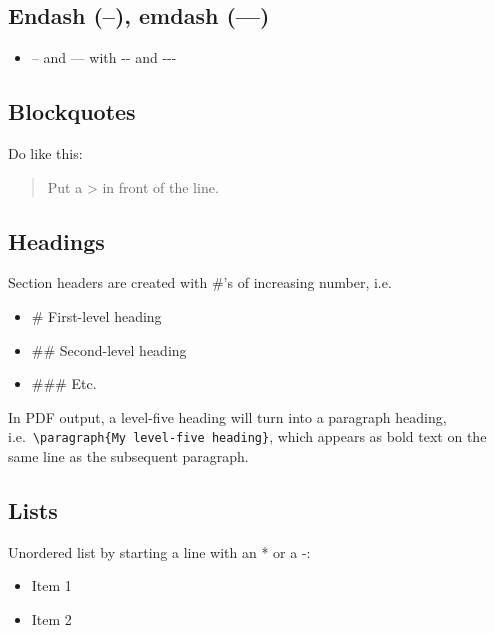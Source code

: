 \documentclass[a4paper, nobind]{templates/ociamthesis}
\providecommand{\tightlist}{%
  \setlength{\itemsep}{0pt}\setlength{\parskip}{0pt}}
\begin{document}
\hypertarget{endash-emdash}{%
\subsection{Endash (--), emdash (---)}\label{endash-emdash}}

\begin{itemize}
\tightlist
\item
  -- and --- with -\/- and -\/-\/-
\end{itemize}

\hypertarget{blockquotes}{%
\subsection{Blockquotes}\label{blockquotes}}

Do like this:

\begin{quote}
Put a \textgreater{} in front of the line.
\end{quote}

\hypertarget{headings}{%
\subsection{Headings}\label{headings}}

Section headers are created with \#'s of increasing number, i.e.~

\begin{itemize}
\tightlist
\item
  \# First-level heading
\item
  \#\# Second-level heading
\item
  \#\#\# Etc.
\end{itemize}

In PDF output, a level-five heading will turn into a paragraph heading, i.e.~\texttt{\textbackslash{}paragraph\{My\ level-five\ heading\}}, which appears as bold text on the same line as the subsequent paragraph.

\hypertarget{lists}{%
\subsection{Lists}\label{lists}}

Unordered list by starting a line with an * or a -:

\begin{itemize}
\tightlist
\item
  Item 1
\item
  Item 2
\end{itemize}
\end{document}
